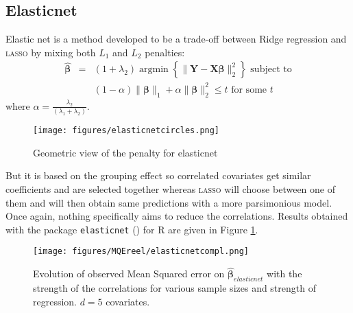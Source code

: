 \documentclass[12pt,a4paper]{report}
\begin{document}
	 \FloatBarrier
		\subsection{Elasticnet}		%

			Elastic net \cite{zou2005regularization} is a method developed to be a trade-off between Ridge regression and \textsc{lasso} by mixing both $L_1$ and $L_2$ penalties: 
	\begin{eqnarray}
		\boldsymbol{\hat{\beta}}&=&(1+\lambda_2) \operatorname{argmin}\left\lbrace \parallel \boldsymbol{Y}-\boldsymbol{X\beta} \parallel_2^2 \right\rbrace \textrm{ subject to} \nonumber \\
			 & &(1-\alpha)\parallel\boldsymbol{\beta}\parallel_1+\alpha\parallel\boldsymbol{\beta}\parallel_2^2\leq t \textrm{ for some } t  \nonumber 
	\end{eqnarray}
	where $\alpha=\frac{\lambda_2}{(\lambda_1+\lambda_2)}$. 
	
	
	\begin{figure}[h!]
			\centering
			\texttt{[image: figures/elasticnetcircles.png]} 
			\caption{Geometric view of the penalty for elasticnet}
		\end{figure}	
	
	But it is based on the grouping effect so correlated covariates get similar coefficients and are selected together whereas \textsc{lasso} will choose between one of them and will then obtain same predictions with a more parsimonious model. Once again, nothing specifically aims to reduce the correlations. Results obtained with the package {\tt elasticnet} (\cite{packageelasticnet}) for R are given in Figure \ref{MQEelasticnetcompl}.

	
	 \begin{figure}
	 \centering
	  \texttt{[image: figures/MQEreel/elasticnetcompl.png]}
	  \caption{Evolution of observed Mean Squared error on $\hat{\boldsymbol{\beta}}_{elasticnet}$ with the strength of the correlations for various sample sizes and strength of regression. $d=5$ covariates. } \label{MQEelasticnetcompl}
	\end{figure}
		
\end{document}
